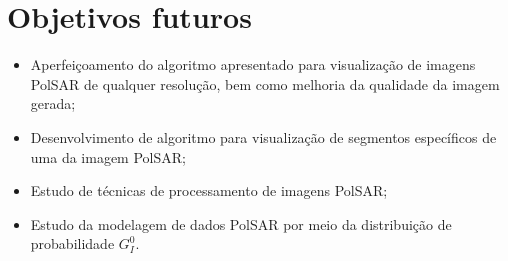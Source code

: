 \documentclass[12pt]{article}
\begin{document}
\section{Objetivos futuros}

\begin{itemize}

\item Aperfeiçoamento do algoritmo apresentado para visualização de imagens PolSAR de qualquer resolução, bem como melhoria da qualidade da imagem gerada;

\item Desenvolvimento de algoritmo para visualização de segmentos específicos de uma da imagem PolSAR;

\item Estudo de técnicas de processamento de imagens PolSAR;

\item Estudo da modelagem de dados PolSAR por meio da distribuição de probabilidade \textit{$G_{I}^0$}.

\end{itemize}



\end{document}

